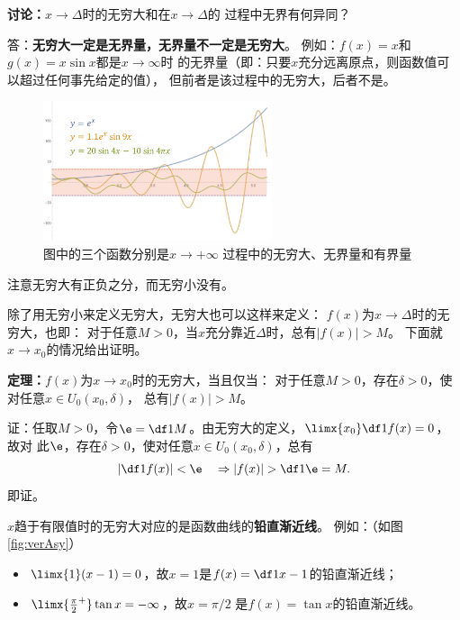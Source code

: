 {\bf 讨论：}$x\to\Delta$时的无穷大和在$x\to\Delta$的
过程中无界有何异同？

\ifhint
答：{\bf 无穷大一定是无界量，无界量不一定是无穷大}。
例如：$f(x)=x$和$g(x)=x\sin x$都是$x\to\infty$时
的无界量（即：只要$x$充分远离原点，则函数值可以超过任何事先给定的值），
但前者是该过程中的无穷大，后者不是。\fin
\fi

\begin{figure}[h]
	\centering
	\includegraphics[width=0.6\textwidth]
	{./Images/Ch01/infvsbded.pdf}
	\caption{图中的三个函数分别是$x\to+\infty$
	过程中的无穷大、无界量和有界量}
	\label{fig:infvsbded}
\end{figure}

注意无穷大有正负之分，而无穷小没有。

\bs

除了用无穷小来定义无穷大，无穷大也可以这样来定义：
$f(x)$为$x\to\Delta$时的无穷大，也即：
对于任意$M>0$，当$x$充分靠近$\Delta$时，总有$|f(x)|>M$。
下面就$x\to x_0$的情况给出证明。

\begin{thx}
	{\bf 定理：}$f(x)$为$x\to x_0$时的无穷大，当且仅当：
	对于任意$M>0$，存在$\delta>0$，使对任意$x\in U_0(x_0,\delta)$，
	总有$|f(x)|>M$。
\end{thx}

证：任取$M>0$，令$\e=\df1M$。由无穷大的定义，$\limx{x_0}\df1{f(x)}=0$，故对
此$\e$，存在$\delta>0$，使对任意$x\in U_0(x_0,\delta)$，总有
$$\left|\df1{f(x)}\right|<\e\quad\Rightarrow |f(x)|>\df1{\e}=M.$$
即证。\fin

\bs
$x$趋于有限值时的无穷大对应的是函数曲线的{\bf 铅直渐近线}。
例如：（如图\ref{fig:verAsy}）
\begin{itemize}
	\setlength{\itemindent}{1cm}
	\item $\limx{1}(x-1)=0$，故$x=1$是$f(x)=\df1{x-1}$的铅直渐近线；
	\item $\limx{\frac{\pi}{2}^+}\tan x=-\infty$，故$x=\pi/2$
	是$f(x)=\tan x$的铅直渐近线。
\end{itemize}
	
